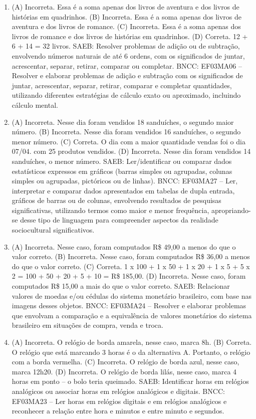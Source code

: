 \begin{enumerate}
\item
(A) Incorreta. Essa é a soma apenas dos livros de aventura e dos livros de histórias em quadrinhos.
(B) Incorreta. Essa é a soma apenas dos livros de aventura e dos livros de romance.
(C) Incorreta. Essa é a soma apenas dos livros de romance e dos livros de histórias em quadrinhos.
(D) Correta. 12 + 6 + 14 = 32 livros.
SAEB: Resolver problemas de adição ou de subtração,
envolvendo números naturais de até 6 ordens, com os significados de juntar, acrescentar, separar, retirar, comparar ou completar.
BNCC: EF03MA06 – Resolver e elaborar problemas de adição e subtração com os significados de
juntar, acrescentar, separar, retirar, comparar e completar quantidades, utilizando diferentes
estratégias de cálculo exato ou aproximado, incluindo cálculo mental.

\item
(A) Incorreta. Nesse dia foram vendidos 18 sanduíches, o segundo maior número.
(B) Incorreta. Nesse dia foram vendidos 16 sanduíches, o segundo menor número.
(C) Correta. O dia com a maior quantidade vendas foi o dia 07/04. com 25 produtos vendidos.
(D) Incorreta. Nesse dia foram vendidos 14 sanduíches, o menor número.
SAEB: Ler/identificar ou comparar dados estatísticos
expressos em gráficos (barras simples ou agrupadas, colunas simples ou
agrupadas, pictóricos ou de linhas).
BNCC: EF03MA27 -- Ler, interpretar e comparar dados apresentados em tabelas de dupla entrada,
gráficos de barras ou de colunas, envolvendo resultados de pesquisas significativas, utilizando
termos como maior e menor frequência, apropriando-se desse tipo de linguagem para
compreender aspectos da realidade sociocultural significativos.

\item
(A) Incorreta. Nesse caso, foram computados R\$ 49,00 a menos do que o valor correto.
(B) Incorreta. Nesse caso, foram computados R\$ 36,00 a menos do que o valor correto.
(C) Correta. 1 x 100 + 1 x 50 + 1 x 20 + 1 x 5 + 5 x 2 = 100 + 50 + 20 + 5 + 10 = R\$ 185,00.
(D) Incorreta. Nesse caso, foram computados R\$ 15,00 a mais do que o valor correto.
SAEB: Relacionar valores de moedas e/ou cédulas do sistema monetário brasileiro, com base nas imagens desses objetos.
BNCC: EF03MA24 -- Resolver e elaborar problemas que envolvam a comparação e a equivalência de
valores monetários do sistema brasileiro em situações de compra, venda e troca.

\item
(A)  Incorreta. O relógio de borda amarela, nesse caso, marca 8h.
(B)  Correta. O relógio que está marcando 3 horas é o da alternativa A. Portanto, o relógio com a borda vermelha.
(C) Incorreta. O relógio de borda azul, nesse caso, marca 12h20.
(D) Incorreta. O relógio de borda lilás, nesse caso, marca 4 horas em ponto -- o bolo teria queimado.
SAEB: Identificar horas em relógios analógicos ou associar horas em relógios analógicos e digitais.
BNCC: EF03MA23 – Ler horas em relógios digitais e em relógios analógicos e reconhecer a relação
entre hora e minutos e entre minuto e segundos.


\end{enumerate}
